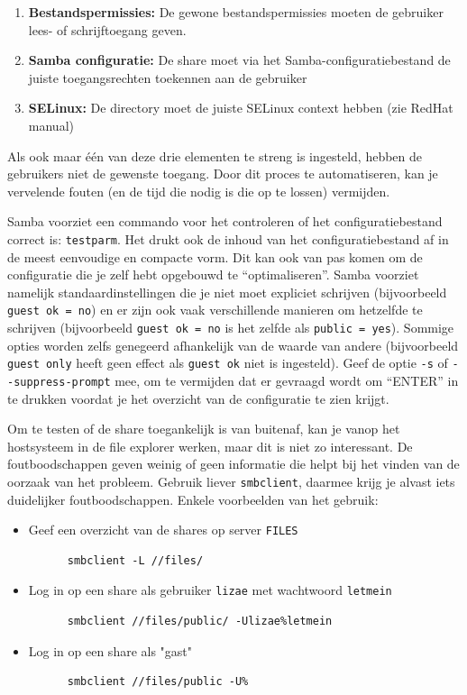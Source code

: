 \begin{enumerate}
\def\labelenumi{\arabic{enumi}.}
\item \textbf{Bestandspermissies:} De gewone bestandspermissies moeten de gebruiker lees- of schrijftoegang geven.
\item \textbf{Samba configuratie:} De share moet via het Samba-configuratiebestand  de juiste toegangsrechten toekennen aan de gebruiker
\item \textbf{SELinux:} De directory moet de juiste SELinux context hebben (zie RedHat manual)
\end{enumerate}

Als ook maar één van deze drie elementen te streng is ingesteld, hebben de gebruikers niet de gewenste toegang. Door dit proces te automatiseren, kan je vervelende fouten (en de tijd die nodig is die op te lossen) vermijden.

Samba voorziet een commando voor het controleren of het configuratiebestand  correct is: \texttt{testparm}. Het drukt ook de inhoud van het configuratiebestand af in de meest eenvoudige en compacte vorm. Dit kan ook van pas komen om de configuratie die je zelf hebt opgebouwd te ``optimaliseren''. Samba voorziet namelijk standaardinstellingen die je niet moet expliciet schrijven (bijvoorbeeld \texttt{guest\ ok\ =\ no}) en er zijn ook vaak verschillende manieren om hetzelfde te schrijven (bijvoorbeeld \texttt{guest\ ok\ =\ no} is het zelfde als \texttt{public\ =\ yes}). Sommige opties worden zelfs genegeerd afhankelijk van de waarde van andere (bijvoorbeeld \texttt{guest\ only} heeft geen effect als \texttt{guest\ ok} niet is ingesteld). Geef de optie \texttt{-s} of \texttt{-\/-suppress-prompt} mee, om te vermijden dat er gevraagd wordt om ``ENTER'' in te drukken voordat je het overzicht van de configuratie te zien krijgt.

Om te testen of de share toegankelijk is van buitenaf, kan je vanop het hostsysteem in de file explorer werken, maar dit is niet zo interessant.  De foutboodschappen geven weinig of geen informatie die helpt bij het vinden van de oorzaak van het probleem. Gebruik liever \texttt{smbclient}, daarmee krijg je alvast iets duidelijker foutboodschappen. Enkele voorbeelden van het gebruik:

\begin{itemize}
  \item Geef een overzicht van de shares op server \texttt{FILES}
    \begin{verbatim}
      smbclient -L //files/
    \end{verbatim}
  \item Log in op een share als gebruiker \texttt{lizae} met wachtwoord \texttt{letmein}
    \begin{verbatim}
      smbclient //files/public/ -Ulizae%letmein
    \end{verbatim}
  \item Log in op een share als "gast"
    \begin{verbatim}
      smbclient //files/public -U%
    \end{verbatim}
\end{itemize}

